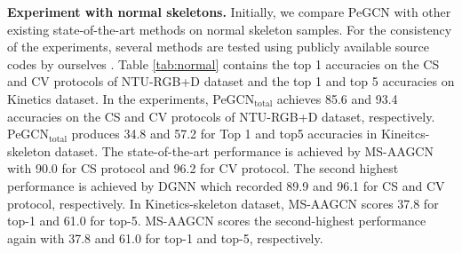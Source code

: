 \documentclass[runningheads]{llncs}
\begin{document}
\textbf{Experiment with normal skeletons.} Initially, we compare PeGCN with other existing state-of-the-art methods on normal skeleton samples. For the consistency of the experiments, several methods are tested using publicly available source codes by ourselves \cite{yan2018spatial,song2019richly,thakkar2018part,shi2019two}. Table \ref{tab:normal} contains the top 1 accuracies on the CS and CV protocols of NTU-RGB+D dataset and the top 1 and top 5 accuracies on Kinetics dataset. In the experiments, PeGCN$_{\text{total}}$ achieves 85.6 and 93.4 accuracies on the CS and CV protocols of NTU-RGB+D dataset, respectively. PeGCN$_{\text{total}}$ produces 34.8 and 57.2 for Top 1 and top5 accuracies in Kineitcs-skeleton dataset. The state-of-the-art performance is achieved by MS-AAGCN \cite{shi2019multi} with 90.0 for CS protocol and 96.2 for CV protocol. The second highest performance is achieved by DGNN \cite{shi2019skeleton} which recorded 89.9 and 96.1 for CS and CV protocol, respectively. In Kinetics-skeleton dataset, MS-AAGCN \cite{shi2019multi} scores 37.8 for top-1 and 61.0 for top-5. MS-AAGCN scores the second-highest performance again with 37.8 and 61.0 for top-1 and top-5, respectively.
\end{document}
